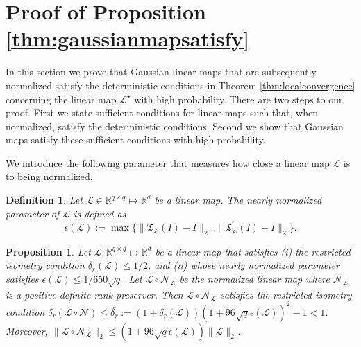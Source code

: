 \documentclass[11pt,letterpaper]{article}
\newtheorem{proposition}[theorem]{Proposition}
\newtheorem{definition}{Definition}
\renewcommand{\L}{\mathcal{L}}
\begin{document}
\section{Proof of Proposition \ref{thm:gaussianmapsatisfy}} \label{apx:randlinmaps}

In this section we prove that Gaussian linear maps that are subsequently normalized satisfy the deterministic conditions in Theorem \ref{thm:localconvergence} concerning the linear map $\mathcal{L}^{\star}$ with high probability.  There are two steps to our proof.  First we state sufficient conditions for linear maps such that, when normalized, satisfy the deterministic conditions.  Second we show that Gaussian maps satisfy these sufficient conditions with high probability. 

We introduce the following parameter that measures how close a linear map $\L$ is to being normalized.

\begin{definition}
	Let $\mathcal{L} \in \mathbb{R}^{q\times q} \mapsto \mathbb{R}^d$ be a linear map. The \emph{nearly normalized parameter} of $\mathcal{L}$ is defined as
	\begin{equation*}
		\epsilon(\mathcal{L}) := \max \{ \|\mathfrak{T}_{\mathcal{L}} (I) - I\|_2, \|\mathfrak{T}_{\mathcal{L}}^{\prime} (I) - I\|_2\} .
	\end{equation*}
\end{definition}

\begin{proposition} \label{thm:ripnppequalsrip}
	Let $\mathcal{L} : \mathbb{R}^{q\times q} \mapsto \mathbb{R}^d$ be a linear map that satisfies (i) the restricted isometry condition $\delta_r(\mathcal{L})\leq 1/2$, and (ii) whose nearly normalized parameter satisfies $\epsilon (\mathcal{L}) \leq 1/ 650 \sqrt{q}$.  Let $\mathcal{L} \circ \mathcal{N}_{\mathcal{L}}$ be the normalized linear map where $\mathcal{N}_{\mathcal{L}}$ is a positive definite rank-preserver.  Then $\mathcal{L} \circ \mathcal{N}_{\mathcal{L}}$ satisfies the restricted isometry condition $\delta_r(\mathcal{L} \circ \mathcal{N}) \leq \bar{\delta_r}:= (1+\delta_r(\mathcal{L})) (1+ 96\sqrt{q} \epsilon (\mathcal{L}))^2 - 1 < 1$. Moreover, $\|\mathcal{L} \circ \mathcal{N}_{\mathcal{L}} \|_2 \leq (1+ 96\sqrt{q} \epsilon (\mathcal{L})) \|\mathcal{L}\|_2$.
\end{proposition}
\end{document}
